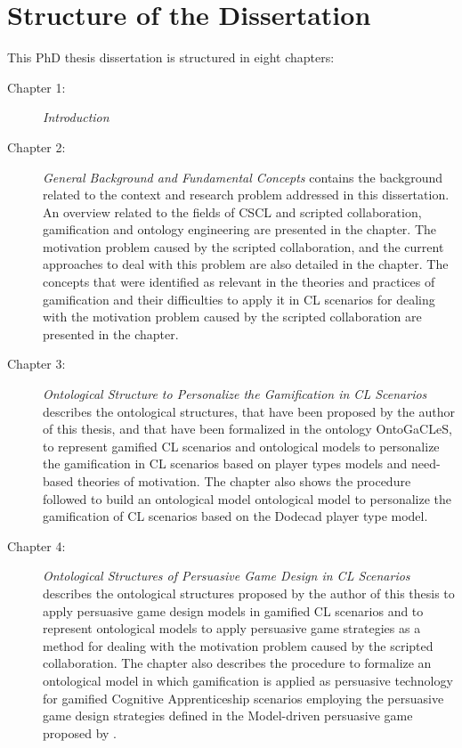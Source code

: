 \section{Structure of the Dissertation}
\label{sec:structure-of-dissertation}

This PhD thesis dissertation is structured in eight chapters:

\begin{description}

\item[Chapter 1:]
\emph{Introduction}

\item[Chapter 2:]
\emph{General Background and Fundamental Concepts}
contains the background related to the context and research problem addressed in this dissertation. An overview related to the fields of CSCL and scripted collaboration, gamification and ontology engineering are presented in the chapter. The motivation problem caused by the scripted collaboration, and the current approaches to deal with this problem are also detailed in the chapter. The concepts that were identified as relevant in the theories and practices of gamification and their difficulties to apply it in CL scenarios for dealing with the motivation problem caused by the scripted collaboration are presented in the chapter.

\item[Chapter 3:]
\emph{Ontological Structure to Personalize the Gamification in CL Scenarios} describes the ontological structures, that have been proposed by the author of this thesis, and that have been formalized in the ontology OntoGaCLeS, to represent gamified CL scenarios and ontological models to personalize the gamification in CL scenarios based on player types models and need-based theories of motivation. The chapter also shows the procedure followed to build an ontological model ontological model to personalize the gamification of CL scenarios based on the Dodecad player type model. 

\item[Chapter 4:]
\emph{Ontological Structures of Persuasive Game Design in CL Scenarios} describes the ontological structures proposed by the author of this thesis to apply persuasive game design models in gamified CL scenarios and to represent ontological models to apply persuasive game strategies as a method for dealing with the motivation problem caused by the scripted collaboration. The chapter also describes the procedure to formalize an ontological model in which gamification is applied as persuasive technology for gamified Cognitive Apprenticeship scenarios employing the persuasive game design strategies defined in the Model-driven persuasive game proposed by .


\end{description}
